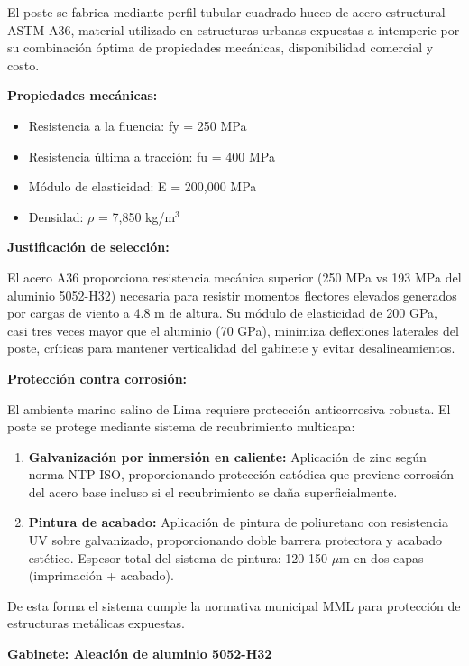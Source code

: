 \documentclass[12pt,a4paper,oneside]{report}
\begin{document}
El poste se fabrica mediante perfil tubular cuadrado hueco de acero estructural ASTM A36, material utilizado en estructuras urbanas expuestas a intemperie por su combinación óptima de propiedades mecánicas, disponibilidad comercial y costo.

\textbf{Propiedades mecánicas:}

\begin{itemize}
\item
  Resistencia a la fluencia: fy = 250 MPa
\item
  Resistencia última a tracción: fu = 400 MPa
\item
  Módulo de elasticidad: E = 200,000 MPa
\item
  Densidad: \ensuremath{\rho} = 7,850 kg/m\ensuremath{^{3}}
\end{itemize}

\textbf{Justificación de selección:}

El acero A36 proporciona resistencia mecánica superior (250 MPa vs 193 MPa del aluminio 5052-H32) necesaria para resistir momentos flectores elevados generados por cargas de viento a 4.8 m de altura. Su módulo de elasticidad de 200 GPa, casi tres veces mayor que el aluminio (70 GPa), minimiza deflexiones laterales del poste, críticas para mantener verticalidad del gabinete y evitar desalineamientos.

\textbf{Protección contra corrosión:}

El ambiente marino salino de Lima requiere protección anticorrosiva robusta. El poste se protege mediante sistema de recubrimiento multicapa:

\begin{enumerate}
\def\labelenumi{\arabic{enumi}.}
\item
  \textbf{Galvanización por inmersión en caliente:} Aplicación de zinc según norma NTP-ISO, proporcionando protección catódica que previene corrosión del acero base incluso si el recubrimiento se daña superficialmente.
\item
  \textbf{Pintura de acabado:} Aplicación de pintura de poliuretano con resistencia UV sobre galvanizado, proporcionando doble barrera protectora y acabado estético. Espesor total del sistema de pintura: 120-150 \ensuremath{\mu}m en dos capas (imprimación + acabado).
\end{enumerate}

De esta forma el sistema cumple la normativa municipal MML para protección de estructuras metálicas expuestas.

\textbf{Gabinete: Aleación de aluminio 5052-H32}
\end{document}
